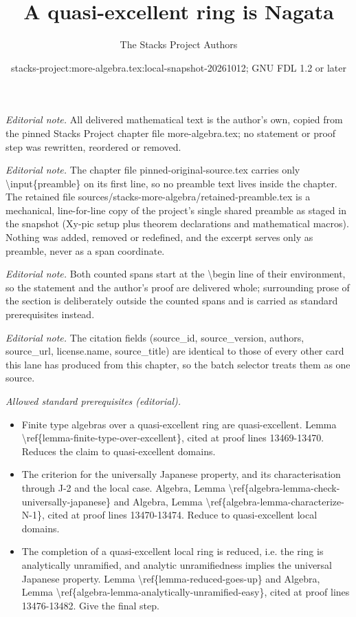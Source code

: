 \documentclass[10pt,a4paper]{amsart}
\title{A quasi-excellent ring is Nagata}
\author{The Stacks Project Authors}
\date{stacks-project:more-algebra.tex:local-snapshot-20261012; GNU FDL 1.2 or later}
\theoremstyle{plain}
\theoremstyle{definition}
\theoremstyle{remark}
\numberwithin{equation}{subsection}
\begin{document}
\maketitle
\setcounter{subsection}{1}
\noindent\textit{Editorial note.} All delivered mathematical text is the author's own, copied from the pinned Stacks Project chapter file more-algebra.tex; no statement or proof step was rewritten, reordered or removed.\par\medskip
\noindent\textit{Editorial note.} The chapter file pinned-original-source.tex carries only \textbackslash{}input\{preamble\} on its first line, so no preamble text lives inside the chapter. The retained file sources/stacks-more-algebra/retained-preamble.tex is a mechanical, line-for-line copy of the project's single shared preamble as staged in the snapshot (Xy-pic setup plus theorem declarations and mathematical macros). Nothing was added, removed or redefined, and the excerpt serves only as preamble, never as a span coordinate.\par\medskip
\noindent\textit{Editorial note.} Both counted spans start at the \textbackslash{}begin line of their environment, so the statement and the author's proof are delivered whole; surrounding prose of the section is deliberately outside the counted spans and is carried as standard prerequisites instead.\par\medskip
\noindent\textit{Editorial note.} The citation fields (source\_id, source\_version, authors, source\_url, license.name, source\_title) are identical to those of every other card this lane has produced from this chapter, so the batch selector treats them as one source.\par\medskip
\noindent\textit{Allowed standard prerequisites (editorial).}\begin{itemize}
\item Finite type algebras over a quasi-excellent ring are quasi-excellent. Lemma \textbackslash{}ref\{lemma-finite-type-over-excellent\}, cited at proof lines 13469-13470. Reduces the claim to quasi-excellent domains.
\item The criterion for the universally Japanese property, and its characterisation through J-2 and the local case. Algebra, Lemma \textbackslash{}ref\{algebra-lemma-check-universally-japanese\} and Algebra, Lemma \textbackslash{}ref\{algebra-lemma-characterize-N-1\}, cited at proof lines 13470-13474. Reduce to quasi-excellent local domains.
\item The completion of a quasi-excellent local ring is reduced, i.e. the ring is analytically unramified, and analytic unramifiedness implies the universal Japanese property. Lemma \textbackslash{}ref\{lemma-reduced-goes-up\} and Algebra, Lemma \textbackslash{}ref\{algebra-lemma-analytically-unramified-easy\}, cited at proof lines 13476-13482. Give the final step.
\end{itemize}\medskip
\end{document}
